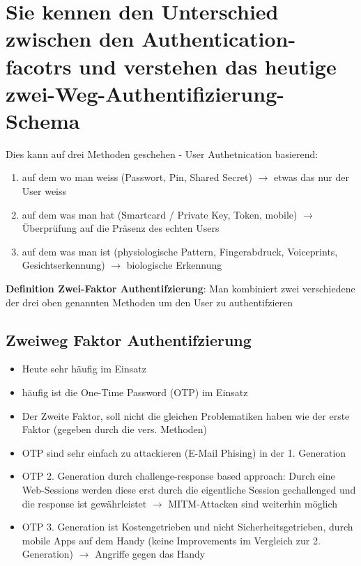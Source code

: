 \documentclass{report}
\theoremstyle{definition}
\theoremstyle{example}
\begin{document}
\section{Sie kennen den Unterschied zwischen den Authentication-facotrs und verstehen das heutige zwei-Weg-Authentifizierung-Schema}
Dies kann auf drei Methoden geschehen - User Authetnication basierend:
\begin{enumerate}
	\item auf dem wo man weiss (Passwort, Pin, Shared Secret) $\rightarrow$ etwas das nur der User weiss
	\item auf dem was man hat (Smartcard / Private Key, Token, mobile) $\rightarrow$ Überprüfung auf die Präsenz des echten Users
	\item auf dem was man ist (physiologische Pattern, Fingerabdruck, Voiceprints, Gesichtserkennung) $\rightarrow$ biologische Erkennung
\end{enumerate}

\textbf{Definition Zwei-Faktor Authentifzierung}: Man kombiniert zwei verschiedene der drei oben genannten Methoden um den User zu authentifzieren
	\subsection{Zweiweg Faktor Authentifzierung}
\begin{itemize}
	\item Heute sehr häufig im Einsatz
	\item häufig ist die One-Time Password (OTP) im Einsatz
	\item Der Zweite Faktor, soll nicht die gleichen Problematiken haben wie der erste Faktor (gegeben durch die vers. Methoden)
	\item OTP sind sehr einfach zu attackieren (E-Mail Phising) in der 1. Generation
	\item OTP 2. Generation durch challenge-response based approach: Durch eine Web-Sessions werden diese erst durch die eigentliche Session gechallenged und die response ist gewährleistet $\rightarrow$ MITM-Attacken sind weiterhin möglich
	\item OTP 3. Generation ist Kostengetrieben und nicht Sicherheitsgetrieben, durch mobile Apps auf dem Handy (keine Improvements im Vergleich zur 2. Generation) $\rightarrow$ Angriffe gegen das Handy
\end{itemize}
\end{document}

